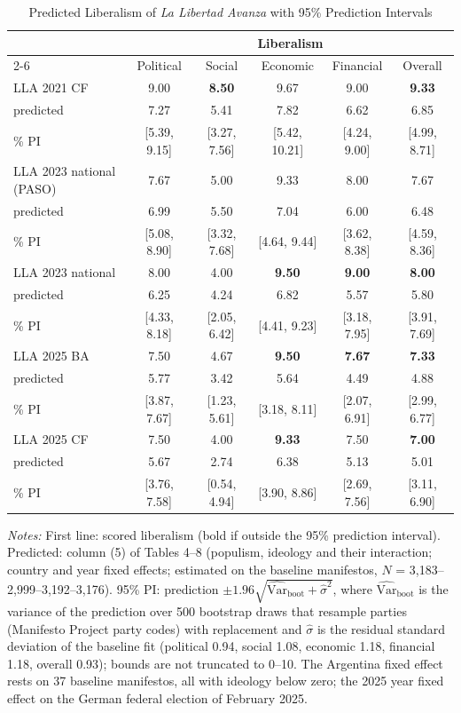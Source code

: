 \begin{table}[htbp]\centering\scriptsize\setlength{\tabcolsep}{4pt}
\caption{Predicted Liberalism of \emph{La Libertad Avanza} with 95\% Prediction Intervals}\label{tab:argentina_lla_intervals}
\begin{tabular}{@{}lccccc@{}}\toprule
 & \multicolumn{5}{c}{Liberalism} \\ \cmidrule(lr){2-6}
 & Political & Social & Economic & Financial & Overall \\ \midrule
LLA 2021 CF & 9.00 & \textbf{8.50} & 9.67 & 9.00 & \textbf{9.33} \\
\quad predicted & 7.27 & 5.41 & 7.82 & 6.62 & 6.85 \\
\quad 95\% PI & [5.39, 9.15] & [3.27, 7.56] & [5.42, 10.21] & [4.24, 9.00] & [4.99, 8.71] \\[2pt]
LLA 2023 national (PASO) & 7.67 & 5.00 & 9.33 & 8.00 & 7.67 \\
\quad predicted & 6.99 & 5.50 & 7.04 & 6.00 & 6.48 \\
\quad 95\% PI & [5.08, 8.90] & [3.32, 7.68] & [4.64, 9.44] & [3.62, 8.38] & [4.59, 8.36] \\[2pt]
LLA 2023 national & 8.00 & 4.00 & \textbf{9.50} & \textbf{9.00} & \textbf{8.00} \\
\quad predicted & 6.25 & 4.24 & 6.82 & 5.57 & 5.80 \\
\quad 95\% PI & [4.33, 8.18] & [2.05, 6.42] & [4.41, 9.23] & [3.18, 7.95] & [3.91, 7.69] \\[2pt]
LLA 2025 BA & 7.50 & 4.67 & \textbf{9.50} & \textbf{7.67} & \textbf{7.33} \\
\quad predicted & 5.77 & 3.42 & 5.64 & 4.49 & 4.88 \\
\quad 95\% PI & [3.87, 7.67] & [1.23, 5.61] & [3.18, 8.11] & [2.07, 6.91] & [2.99, 6.77] \\[2pt]
LLA 2025 CF & 7.50 & 4.00 & \textbf{9.33} & 7.50 & \textbf{7.00} \\
\quad predicted & 5.67 & 2.74 & 6.38 & 5.13 & 5.01 \\
\quad 95\% PI & [3.76, 7.58] & [0.54, 4.94] & [3.90, 8.86] & [2.69, 7.56] & [3.11, 6.90] \\[2pt]
\bottomrule\end{tabular}
\begin{minipage}{0.95\textwidth}\vspace{2pt}\scriptsize\textit{Notes:} First line: scored liberalism (bold if outside the 95\% prediction interval). Predicted: column (5) of Tables 4--8 (populism, ideology and their interaction; country and year fixed effects; estimated on the baseline manifestos, $N$ = 3,183--2,999--3,192--3,176). 95\% PI: prediction $\pm 1.96\sqrt{\widehat{\mathrm{Var}}_{\mathrm{boot}} + \hat\sigma^2}$, where $\widehat{\mathrm{Var}}_{\mathrm{boot}}$ is the variance of the prediction over 500 bootstrap draws that resample parties (Manifesto Project party codes) with replacement and $\hat\sigma$ is the residual standard deviation of the baseline fit (political 0.94, social 1.08, economic 1.18, financial 1.18, overall 0.93); bounds are not truncated to 0--10. The Argentina fixed effect rests on 37 baseline manifestos, all with ideology below zero; the 2025 year fixed effect on the German federal election of February 2025.\end{minipage}
\end{table}
